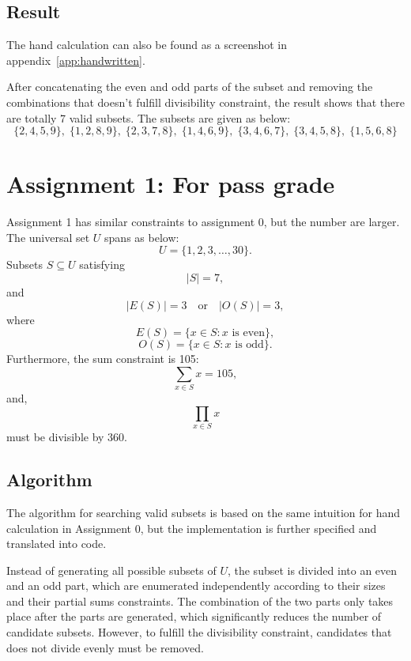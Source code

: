 \documentclass[11pt,a4paper]{article}
\begin{document}
\subsection*{Result}

The hand calculation can also be found as a screenshot in appendix~\ref{app:handwritten}.

After concatenating the even and odd parts of the subset and removing the combinations that doesn't fulfill divisibility constraint, the result shows that there are totally 7 valid subsets. The subsets are given as below:
\[
\{2, 4, 5, 9\},\;
\{1, 2, 8, 9\},\;
\{2, 3, 7, 8\},\;
\{1, 4, 6, 9\},\;
\{3, 4, 6, 7\},\;
\{3, 4, 5, 8\},\;
\{1, 5, 6, 8\}
\]



\section*{Assignment 1: For pass grade}

Assignment 1 has similar constraints to assignment 0, but the number are larger. The universal set $U$ spans as below:
\[
U = \{1,2,3,\ldots,30\}.
\]
Subsets $S\subseteq U$ satisfying
\[
|S|=7,
\]
and
\[
|E(S)|=3
\quad\text{or}\quad
|O(S)|=3,
\]
where
\[
E(S)=\{x\in S:x\text{ is even}\},
\]
\[
O(S)=\{x\in S:x\text{ is odd}\}.
\]
Furthermore, the sum constraint is 105:
\[
\sum_{x\in S}x=105,
\]
and,
\[
\prod_{x\in S}x
\]
must be divisible by $360$.


\subsection*{Algorithm}


The algorithm for searching valid subsets is based on the same intuition for hand calculation in Assignment 0, but the implementation is further specified and translated into code.

Instead of generating all possible subsets of $U$, the subset is divided into an even and an odd part, which are enumerated independently according to their sizes and their partial sums constraints. The combination of the two parts only takes place after the parts are generated, which significantly reduces the number of candidate subsets. However, to fulfill the divisibility constraint, candidates that does not divide evenly must be removed.
\end{document}
